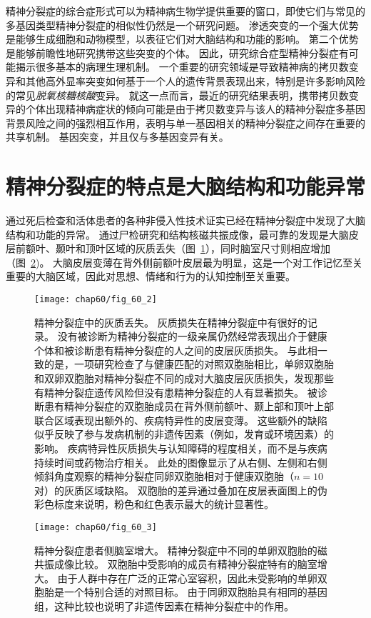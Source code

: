 精神分裂症的综合症形式可以为精神病生物学提供重要的窗口，即使它们与常见的多基因类型精神分裂症的相似性仍然是一个研究问题。
渗透突变的一个强大优势是能够生成细胞和动物模型，以表征它们对大脑结构和功能的影响。
第二个优势是能够前瞻性地研究携带这些突变的个体。
因此，研究综合症型精神分裂症有可能揭示很多基本的病理生理机制。
一个重要的研究领域是导致精神病的拷贝数变异和其他高外显率突变如何基于一个人的遗传背景表现出来，特别是许多影响风险的常见\textit{脱氧核糖核酸}变异。
就这一点而言，最近的研究结果表明，携带拷贝数变异的个体出现精神病症状的倾向可能是由于拷贝数变异与该人的精神分裂症多基因背景风险之间的强烈相互作用，表明与单一基因相关的精神分裂症之间存在重要的共享机制。
基因突变，并且仅与多基因变异有关。



\section{精神分裂症的特点是大脑结构和功能异常}

通过死后检查和活体患者的各种非侵入性技术证实已经在精神分裂症中发现了大脑结构和功能的异常。
通过尸检研究和结构核磁共振成像，最可靠的发现是大脑皮层前额叶、颞叶和顶叶区域的灰质丢失（图~\ref{fig:60_2}），同时脑室尺寸则相应增加（图~\ref{fig:60_3})。
大脑皮层变薄在背外侧前额叶皮层最为明显，这是一个对工作记忆至关重要的大脑区域，因此对思想、情绪和行为的认知控制至关重要。



\begin{figure}[htbp]
	\centering
	\texttt{[image: chap60/fig\_60\_2]}
	\caption{精神分裂症中的灰质丢失。
		灰质损失在精神分裂症中有很好的记录。
		没有被诊断为精神分裂症的一级亲属仍然经常表现出介于健康个体和被诊断患有精神分裂症的人之间的皮层灰质损失。
		与此相一致的是，一项研究检查了与健康匹配的对照双胞胎相比，单卵双胞胎和双卵双胞胎对精神分裂症不同的成对大脑皮层灰质损失，发现那些有精神分裂症遗传风险但没有患精神分裂症的人有显著损失。
		被诊断患有精神分裂症的双胞胎成员在背外侧前额叶、颞上部和顶叶上部联合区域表现出额外的、疾病特异性的皮层变薄。
		这些额外的缺陷似乎反映了参与发病机制的非遗传因素（例如，发育或环境因素）的影响。
		疾病特异性灰质损失与认知障碍的程度相关，而不是与疾病持续时间或药物治疗相关。
		此处的图像显示了从右侧、左侧和右侧倾斜角度观察的精神分裂症同卵双胞胎相对于健康双胞胎（$ n = 10 $ 对）的灰质区域缺陷。
		双胞胎的差异通过叠加在皮层表面图上的伪彩色标度来说明，粉色和红色表示最大的统计显著性\cite{cannon2002cortex}。}
	\label{fig:60_2}
\end{figure}


\begin{figure}[htbp]
	\centering
	\texttt{[image: chap60/fig\_60\_3]}
	\caption{
		精神分裂症患者侧脑室增大。
		精神分裂症中不同的单卵双胞胎的磁共振成像比较。
		双胞胎中受影响的成员有精神分裂症特有的脑室增大。
		由于人群中存在广泛的正常心室容积，因此未受影响的单卵双胞胎是一个特别合适的对照目标。
		由于同卵双胞胎具有相同的基因组，这种比较也说明了非遗传因素在精神分裂症中的作用。}
	\label{fig:60_3}
\end{figure}


